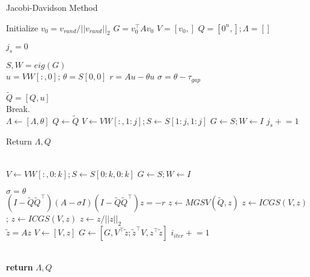 \documentclass[a4paper]{article}
\begin{document}
\begin{algorithm}
\caption{Jacobi-Davidson Method}\label{alg:JDM}
\begin{algorithmic}[1]

\State Initialize $v_0 = v_{rand} / ||v_{rand}||_2$ 
\State $G = v_0^\top A v_0$ 
\State $V = [v_0,]$ 
\State $Q = [0^n,]; \Lambda = [] $

\State $j_s = 0$ 
\\


    \State $ S,W = eig(G)$
        \\
        \State $u = VW[:,0]$; $\theta = S[0,0]$
        \State $r = Au - \theta u$
        \State $\sigma = \theta - \tau_{gap}$
        
        \State $\tilde{Q} = [Q,u]$
    \\
        \If{$(||r||_2 > \epsilon) \cup ( (dim(S)[0] <= 1) \cap (j_s \mathrel{!}= k - 1))$]} 
            \State Break.
        \EndIf
        \\
        \State $\Lambda \gets [\Lambda, \theta]$
        \State $Q \gets \tilde{Q}$
        \State $V \gets V W[:,1:j]; S \gets S[1:j,1:j]$
        \State $G \gets S ; W \gets I$
        \State $j_s \mathrel{+} = 1$

            \State Return $\Lambda, Q$ 
        \EndIf

    \EndWhile
    \\ 
        \State $V \gets VW[:, 0:k] ; S \gets S[0:k,0:k] $
        \State $G \gets S; W \gets I $
    \EndIf

        \State $\sigma = \theta$
    \EndIf
    \\
    \State $(I-\tilde{Q}\tilde{Q}^\top) (A - \sigma I ) (I - \tilde{Q}\tilde{Q}^\top) z = -r$ 
    \State $z \gets MGSV(\tilde{Q}, z)$ 
    \State $z \gets ICGS(V, z)$ ; $z \gets ICGS(V, z)$
    \State $z \gets z / ||z||_2$
    \\
    \State $\tilde{z} = Az$
    \State $V \gets [V,z]$ 
    \State $G \gets [G, V^\top \tilde{z} ; \tilde{z}^\top V, z^\top \tilde{z}]$ 
    \State $i_{iter} \mathrel{+}= 1 $
\EndFor

\\
\State \textbf{return} $\Lambda, Q$ 
\EndProcedure
\end{algorithmic}
\end{algorithm}
\end{document}
